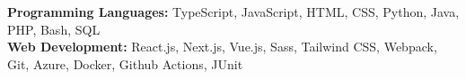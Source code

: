 \vspace{5pt}\item{
    \textbf{Programming Languages:} 
    TypeScript,
    JavaScript,
    HTML,
    CSS,
    Python,
    Java,
    PHP,
    Bash,
    SQL \\
    
    \textbf{Web Development:} 
    React.js,
    Next.js,
    Vue.js,
    Sass,
    Tailwind CSS,
    Webpack,
    Git,
    Azure,
    Docker,
    Github Actions,
    JUnit \\
}
